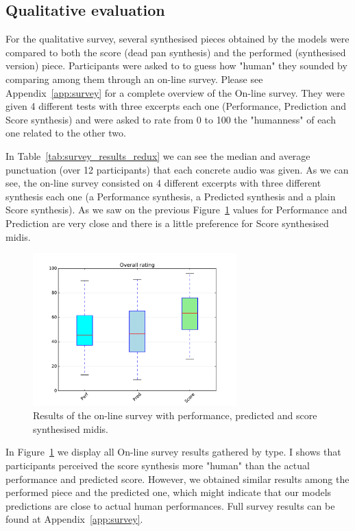 \subsection{Qualitative evaluation}

For the qualitative survey, several synthesised pieces obtained by the models were compared to both the score (dead pan synthesis) and the performed (synthesised version) piece. Participants were asked to to guess how "human" they sounded by comparing among them through an on-line survey. Please see Appendix~\ref{app:survey} for a complete overview of the On-line survey.
They were given 4 different tests with three excerpts each one (Performance, Prediction and Score synthesis) and were asked to rate from 0 to 100 the "humanness" of each one related to the other two.

In Table~\ref{tab:survey_results_redux} we can see the median and average punctuation (over 12 participants) that each concrete audio was given. As we can see, the on-line survey consisted on 4 different excerpts with three different synthesis each one (a Performance synthesis, a Predicted synthesis and a plain Score synthesis). As we saw on the previous Figure~\ref{fig:survey} values for Performance and Prediction are very close and there is a little preference for Score synthesised midis.


\begin{figure}[!ht]
\centering
\includegraphics[width=0.7\textwidth]{Figures/survey.pdf}
\caption{Results of the on-line survey with performance, predicted and score synthesised midis.}
\label{fig:survey}
\end{figure}


In Figure~\ref{fig:survey} we display all On-line survey results gathered by type. I shows that participants perceived the score synthesis more "human" than the actual performance and predicted score. However, we obtained similar results among the performed piece and the predicted one, which might indicate that our models predictions are close to actual human performances. Full survey results can be found at Appendix~\ref{app:survey}.



